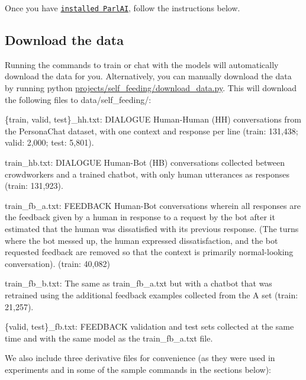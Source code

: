 Once you have \href{https://github.com/facebookresearch/ParlAI/#installing-parlai}{\tt installed Parl\+AI}, follow the instructions below.

\subsection*{Download the data}

Running the commands to train or chat with the models will automatically download the data for you. Alternatively, you can manually download the data by running {\ttfamily python \hyperlink{download__data_8py}{projects/self\+\_\+feeding/download\+\_\+data.\+py}}. This will download the following files to {\ttfamily data/self\+\_\+feeding/}\+:


\begin{DoxyItemize}
\item {\ttfamily \{train, valid, test\}\+\_\+hh.\+txt}\+: D\+I\+A\+L\+O\+G\+UE Human-\/\+Human (HH) conversations from the Persona\+Chat dataset, with one context and response per line (train\+: 131,438; valid\+: 2,000; test\+: 5,801).
\item {\ttfamily train\+\_\+hb.\+txt}\+: D\+I\+A\+L\+O\+G\+UE Human-\/\+Bot (HB) conversations collected between crowdworkers and a trained chatbot, with only human utterances as responses (train\+: 131,923).
\item {\ttfamily train\+\_\+fb\+\_\+a.\+txt}\+: F\+E\+E\+D\+B\+A\+CK Human-\/\+Bot conversations wherein all responses are the feedback given by a human in response to a request by the bot after it estimated that the human was dissatisfied with its previous response. (The turns where the bot messed up, the human expressed dissatisfaction, and the bot requested feedback are removed so that the context is primarily normal-\/looking conversation). (train\+: 40,082)
\item {\ttfamily train\+\_\+fb\+\_\+b.\+txt}\+: The same as {\ttfamily train\+\_\+fb\+\_\+a.\+txt} but with a chatbot that was retrained using the additional feedback examples collected from the A set (train\+: 21,257).
\item {\ttfamily \{valid, test\}\+\_\+fb.\+txt}\+: F\+E\+E\+D\+B\+A\+CK validation and test sets collected at the same time and with the same model as the {\ttfamily train\+\_\+fb\+\_\+a.\+txt} file.
\end{DoxyItemize}

We also include three derivative files for convenience (as they were used in experiments and in some of the sample commands in the sections below)\+:



